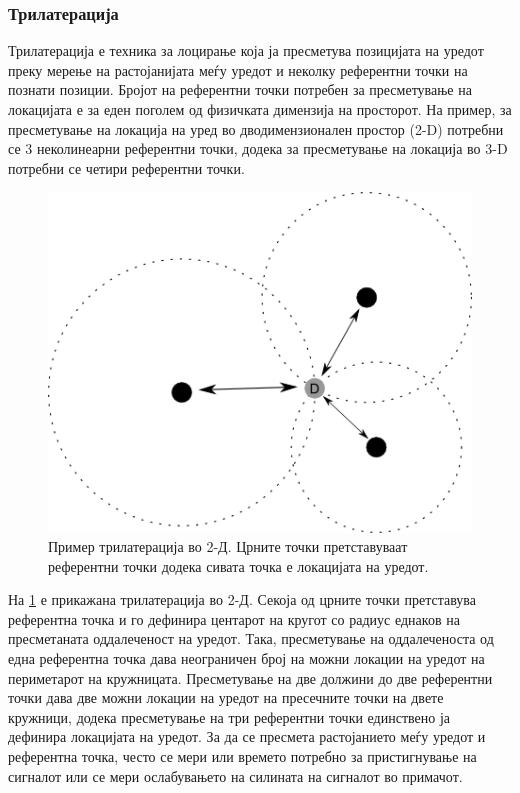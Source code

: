 \subsubsection{Трилатерација}

Трилатерација е техника за лоцирање која ја пресметува позицијата на уредот
преку мерење на растојанијата меѓу уредот и неколку референтни точки на познати
позиции. Бројот на референтни точки потребен за пресметување на локацијата е за
еден поголем од физичката димензија на просторот. На пример, за пресметување на
локација на уред во дводимензионален простор (2-D) потребни се 3 неколинеарни
референтни точки, додека за пресметување на локација во 3-D потребни се четири
референтни точки. 

\begin{figure}[htb]
\centering
\includegraphics[scale=0.4]{images/trilateration}
\caption{Пример трилатерација во 2-Д. Црните точки претставуваат референтни
точки додека сивата точка е локацијата на уредот.}
\label{fig:trilateration}
\end{figure}

На \ref{fig:trilateration} е прикажана трилатерација во 2-Д. Секоја од црните
точки претставува референтна точка и го дефинира центарот на кругот со радиус
еднаков на пресметаната оддалеченост на уредот. Така, пресметување на
оддалеченоста од една референтна точка дава неограничен број на можни локации на
уредот на периметарот на кружницата. Пресметување на две должини до две
референтни точки дава две можни локации на уредот на пресечните точки на двете
кружници, додека пресметување на три референтни точки единствено ја дефинира
локацијата на уредот. За да се пресмета растојанието меѓу уредот и референтна
точка, често се мери или времето потребно за пристигнување на сигналот или се
мери ослабувањето на силината на сигналот во примачот.
 


